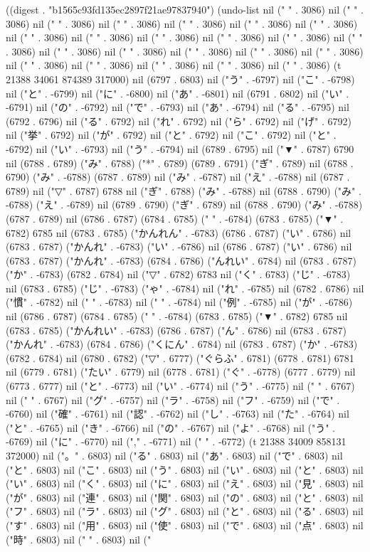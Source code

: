 
((digest . "b1565c93fd135ec2897f21ae97837940") (undo-list nil (" " . 3086) nil (" " . 3086) nil (" " . 3086) nil (" " . 3086) nil (" " . 3086) nil (" " . 3086) nil (" " . 3086) nil (" " . 3086) nil (" " . 3086) nil (" " . 3086) nil (" " . 3086) nil (" " . 3086) nil (" " . 3086) nil (" " . 3086) nil (" " . 3086) nil (" " . 3086) nil (" " . 3086) nil (" " . 3086) nil (" " . 3086) nil (" " . 3086) nil (" " . 3086) nil (" " . 3086) nil (" " . 3086) (t 21388 34061 874389 317000) nil (6797 . 6803) nil ("う" . -6797) nil ("こ" . -6798) nil ("と" . -6799) nil ("に" . -6800) nil ("あ" . -6801) nil (6791 . 6802) nil ("い" . -6791) nil ("の" . -6792) nil ("で" . -6793) nil ("あ" . -6794) nil ("る" . -6795) nil (6792 . 6796) nil ("る" . 6792) nil ("れ" . 6792) nil ("ら" . 6792) nil ("げ" . 6792) nil ("挙" . 6792) nil ("が" . 6792) nil ("と" . 6792) nil ("こ" . 6792) nil ("と" . -6792) nil ("い" . -6793) nil ("う" . -6794) nil (6789 . 6795) nil ("▼" . 6787) 6790 nil (6788 . 6789) ("み" . 6788) ("*" . 6789) (6789 . 6791) ("ぎ" . 6789) nil (6788 . 6790) ("み" . -6788) (6787 . 6789) nil ("み" . -6787) nil ("え" . -6788) nil (6787 . 6789) nil ("▽" . 6787) 6788 nil ("ぎ" . 6788) ("み" . -6788) nil (6788 . 6790) ("み" . -6788) ("え" . -6789) nil (6789 . 6790) ("ぎ" . 6789) nil (6788 . 6790) ("み" . -6788) (6787 . 6789) nil (6786 . 6787) (6784 . 6785) (" " . -6784) (6783 . 6785) ("▼" . 6782) 6785 nil (6783 . 6785) ("かんれん" . -6783) (6786 . 6787) ("い" . 6786) nil (6783 . 6787) ("かんれ" . -6783) ("い" . -6786) nil (6786 . 6787) ("い" . 6786) nil (6783 . 6787) ("かんれ" . -6783) (6784 . 6786) ("んれい" . 6784) nil (6783 . 6787) ("か" . -6783) (6782 . 6784) nil ("▽" . 6782) 6783 nil ("く" . 6783) ("じ" . -6783) nil (6783 . 6785) ("じ" . -6783) ("ゃ" . -6784) nil ("れ" . -6785) nil (6782 . 6786) nil ("慣" . -6782) nil ("
" . -6783) nil (" " . -6784) nil ("例" . -6785) nil ("が" . -6786) nil (6786 . 6787) (6784 . 6785) (" " . -6784) (6783 . 6785) ("▼" . 6782) 6785 nil (6783 . 6785) ("かんれい" . -6783) (6786 . 6787) ("ん" . 6786) nil (6783 . 6787) ("かんれ" . -6783) (6784 . 6786) ("くにん" . 6784) nil (6783 . 6787) ("か" . -6783) (6782 . 6784) nil (6780 . 6782) ("▽" . 6777) ("ぐらふ" . 6781) (6778 . 6781) 6781 nil (6779 . 6781) ("たい" . 6779) nil (6778 . 6781) ("ぐ" . -6778) (6777 . 6779) nil (6773 . 6777) nil ("と" . -6773) nil ("い" . -6774) nil ("う" . -6775) nil (" " . 6767) nil ("
" . 6767) nil ("グ" . -6757) nil ("ラ" . -6758) nil ("フ" . -6759) nil ("で" . -6760) nil ("確" . -6761) nil ("認" . -6762) nil ("し" . -6763) nil ("た" . -6764) nil ("と" . -6765) nil ("き" . -6766) nil ("の" . -6767) nil ("よ" . -6768) nil ("う" . -6769) nil ("に" . -6770) nil ("," . -6771) nil (" " . -6772) (t 21388 34009 858131 372000) nil ("。" . 6803) nil ("る" . 6803) nil ("あ" . 6803) nil ("で" . 6803) nil ("と" . 6803) nil ("こ" . 6803) nil ("う" . 6803) nil ("い" . 6803) nil ("と" . 6803) nil ("い" . 6803) nil ("く" . 6803) nil ("に" . 6803) nil ("え" . 6803) nil ("見" . 6803) nil ("が" . 6803) nil ("連" . 6803) nil ("関" . 6803) nil ("の" . 6803) nil ("と" . 6803) nil ("フ" . 6803) nil ("ラ" . 6803) nil ("グ" . 6803) nil ("と" . 6803) nil ("る" . 6803) nil ("す" . 6803) nil ("用" . 6803) nil ("使" . 6803) nil ("で" . 6803) nil ("点" . 6803) nil ("時" . 6803) nil (" " . 6803) nil ("
